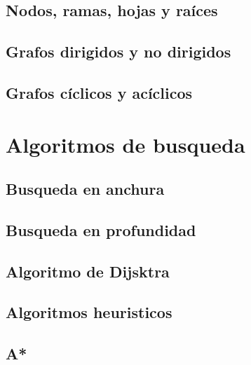 \documentclass{article}
\begin{document}
\subsection{Nodos, ramas, hojas y raíces}

\subsection{Grafos dirigidos y no dirigidos}

\subsection{Grafos cíclicos y acíclicos}

\section{Algoritmos de busqueda}

\subsection{Busqueda en anchura}

\subsection{Busqueda en profundidad}

\subsection{Algoritmo de Dijsktra}

\subsection{Algoritmos heuristicos}

\subsection{A*}
\end{document}
